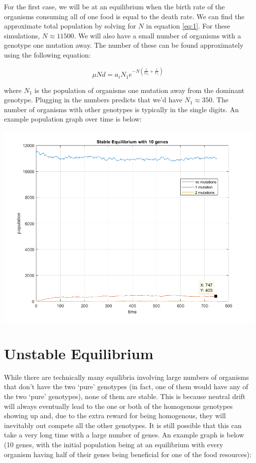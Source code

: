 \documentclass[11pt]{article}
\begin{document}
	For the first case, we will be at an equilibrium when the birth rate of the organisms consuming all of one food is equal to the death rate.	We can find the approximate total population by solving for $N$ in equation \ref{eq:1}. For these simulations, $N \approx 11500$. We will also have a small number of organisms with a genotype one mutation away. The number of these can be found approximately using the following equation:
	
	\begin{equation*}
		\mu N d = a_iN_1e^{-N(\frac{1}{C_0} + \frac{1}{C_i})}
	\end{equation*}
	
	where $N_1$ is the population of organisms one mutation away from the dominant genotype. Plugging in the numbers predicts that we'd have $N_1 \approx 350$. The number of organisms with other genotypes is typically in the single digits. An example population graph over time is below:
	
	\includegraphics[scale = .6]{stable_equil}

\section*{Unstable Equilibrium}

	While there are technically many equilibria involving large numbers of organisms that don't have the two `pure' genotypes (in fact, one of them would have any of the two `pure' genotypes), none of them are stable. This is because neutral drift will always eventually lead to the one or both of the homogenous genotypes showing up and, due to the extra reward for being homogenous, they will inevitably out compete all the other genotypes. It is still possible that this can take a very long time with a large number of genes. An example graph is below (10 genes, with the initial population being at an equilibrium with every organism having half of their genes being beneficial for one of the food resources): 
	
\end{document}
